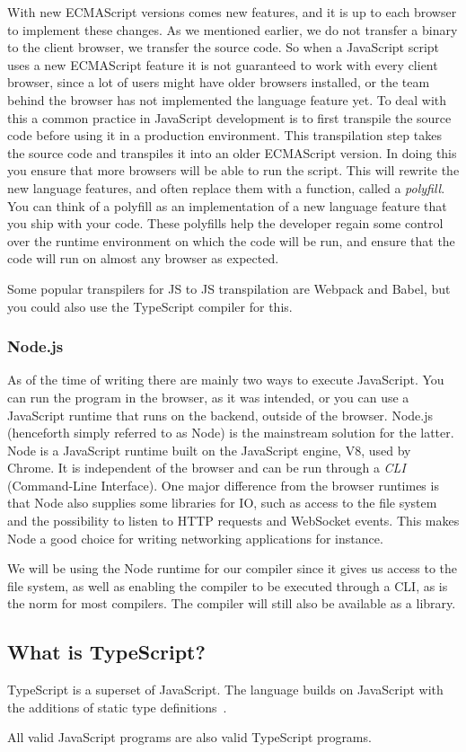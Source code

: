 With new ECMAScript versions comes new features, and it is up to each browser to implement these changes.
As we mentioned earlier, we do not transfer a binary to the client browser, we transfer the source code.
So when a JavaScript script uses a new ECMAScript feature it is not guaranteed to work with every client browser, since a lot of users might have older browsers installed, or the team behind the browser has not implemented the language feature yet.
To deal with this a common practice in JavaScript development is to first transpile the source code before using it in a production environment.
This transpilation step takes the source code and transpiles it into an older ECMAScript version.
In doing this you ensure that more browsers will be able to run the script.
This will rewrite the new language features, and often replace them with a function, called a \textit{polyfill}.
You can think of a polyfill as an implementation of a new language feature that you ship with your code.
These polyfills help the developer regain some control over the runtime environment on which the code will be run, and ensure that the code will run on almost any browser as expected.

Some popular transpilers for JS to JS transpilation are Webpack and Babel, but you could also use the TypeScript compiler for this.

\subsubsection{Node.js}\label{subsubsec:node}

As of the time of writing there are mainly two ways to execute JavaScript.
You can run the program in the browser, as it was intended, or you can use a JavaScript runtime that runs on the backend, outside of the browser.
Node.js (henceforth simply referred to as Node) is the mainstream solution for the latter.
Node is a JavaScript runtime built on the JavaScript engine, V8, used by Chrome.
It is independent of the browser and can be run through a \textit{CLI} (Command-Line Interface).
One major difference from the browser runtimes is that Node also supplies some libraries for IO, such as access to the file system and the possibility to listen to HTTP requests and WebSocket events.
This makes Node a good choice for writing networking applications for instance.

We will be using the Node runtime for our compiler since it gives us access to the file system, as well as enabling the compiler to be executed through a CLI, as is the norm for most compilers.
The compiler will still also be available as a library.

\subsection{What is TypeScript?}\label{subsec:what-is-typescript}

TypeScript is a superset of JavaScript.
The language builds on JavaScript with the additions of static type definitions~\cite{tswebsite}.

All valid JavaScript programs are also valid TypeScript programs.
